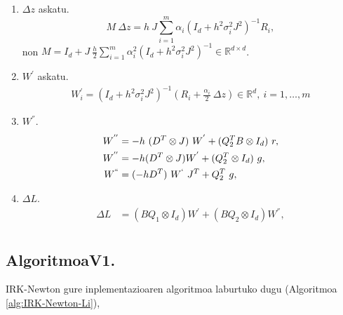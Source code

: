 \begin{enumerate}

\item $\Delta z$  askatu.
\begin{equation*}
M \ \Delta z=h \ J\sum\limits_{i=1}^{m}\alpha_i (I_d+h^2\sigma_i^2J^2)^{-1}R_i,
\end{equation*}
non $M=I_d+J \ \frac{h}{2}\sum\limits_{i=1}^{m} \alpha_i^2 (I_d+h^2 \sigma_i^2 J^2)^{-1} \in \mathbb{R}^{d \times d}$.

\item  $W^{'}$ askatu.
\begin{align*}
W^{'}_i=(I_d+h^2\sigma_i^2J^2)^{-1} (R_i+\frac{\alpha_i}{2} \ \Delta z) \in \mathbb{R}^d, \ i=1,\dots,m
\end{align*}

\item $W^{''}$.
\begin{align*}
W^{''} &= -h \ (D^T \otimes J) \ W^{'}+(Q_2^T B \otimes I_d) \ r, \\
W^{''} &= -h (D^T \otimes J) W^{'}+ (Q_2^T \otimes I_d) \ g, \\
W^{``} &= (-hD^T) \ W^{`} \ J^T+Q_2^T \ g,
\end{align*}


\item $\Delta L$.
\begin{align*}
\Delta L &=(B Q_1 \otimes I_d) W^{'}+(B Q_2 \otimes I_d) W^{''}, \\
\end{align*}

\end{enumerate}

\subsection*{AlgoritmoaV1.}

IRK-Newton gure inplementazioaren algoritmoa laburtuko dugu (Algoritmoa \ref{alg:IRK-Newton-Li}), 

